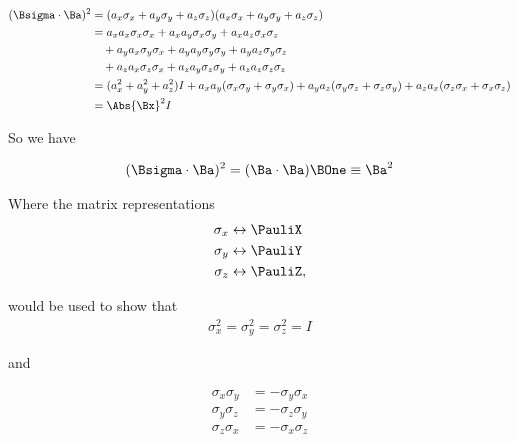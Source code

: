 \begin{equation}\label{eqn:lecture8makingSenseOfQM:1160}
\begin{aligned}
(\Bsigma \cdot \Ba)^2
&=
(a_x \sigma_x
+ a_y \sigma_y
+ a_z \sigma_z)
(a_x \sigma_x
+ a_y \sigma_y
+ a_z \sigma_z) \\
&=
a_x a_x \sigma_x \sigma_x
+a_x a_y \sigma_x \sigma_y
+a_x a_z \sigma_x \sigma_z \\
&\quad+a_y a_x \sigma_y \sigma_x
+a_y a_y \sigma_y \sigma_y
+a_y a_z \sigma_y \sigma_z \\
&\quad+a_z a_x \sigma_z \sigma_x
+a_z a_y \sigma_z \sigma_y
+a_z a_z \sigma_z \sigma_z \\
&= (a_x^2 + a_y^2 + a_z^2) I
+ a_x a_y ( \sigma_x \sigma_y + \sigma_y \sigma_x)
+ a_y a_z ( \sigma_y \sigma_z + \sigma_z \sigma_y)
+ a_z a_x ( \sigma_z \sigma_x + \sigma_x \sigma_z) \\
&= \Abs{\Bx}^2 I
\end{aligned}
\end{equation}

So we have

\begin{equation}\label{eqn:PHY356HNov2:135}
\begin{aligned}
(\Bsigma \cdot \Ba)^2 = (\Ba \cdot \Ba) \BOne \equiv \Ba^2
\end{aligned}
\end{equation}

Where the matrix representations
\begin{equation}\label{eqn:PHY356HNov2:140}
\begin{aligned}
\sigma_x &\leftrightarrow \PauliX \\
\sigma_y &\leftrightarrow \PauliY \\
\sigma_z &\leftrightarrow \PauliZ,
\end{aligned}
\end{equation}

would be used to show that
\begin{equation}\label{eqn:PHY356HNov2:150}
\begin{aligned}
\sigma_x^2 = \sigma_y^2 = \sigma_z^2 = I
\end{aligned}
\end{equation}

and

\begin{equation}\label{eqn:PHY356HNov2:155}
\begin{aligned}
\sigma_x \sigma_y &= -\sigma_y \sigma_x \\
\sigma_y \sigma_z &= -\sigma_z \sigma_y \\
\sigma_z \sigma_x &= -\sigma_x \sigma_z
\end{aligned}
\end{equation}

